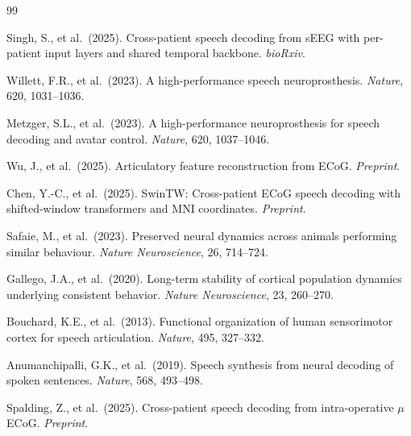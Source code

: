 \documentclass[11pt,letterpaper]{article}
\begin{document}
\begin{thebibliography}{99}\raggedright

Singh, S., et al.\ (2025).
Cross-patient speech decoding from sEEG with per-patient input layers and shared temporal backbone.
\textit{bioRxiv}.

Willett, F.R., et al.\ (2023).
A high-performance speech neuroprosthesis.
\textit{Nature}, 620, 1031--1036.

Metzger, S.L., et al.\ (2023).
A high-performance neuroprosthesis for speech decoding and avatar control.
\textit{Nature}, 620, 1037--1046.

Wu, J., et al.\ (2025).
Articulatory feature reconstruction from ECoG.
\textit{Preprint}.

Chen, Y.-C., et al.\ (2025).
SwinTW: Cross-patient ECoG speech decoding with shifted-window transformers and MNI coordinates.
\textit{Preprint}.

Safaie, M., et al.\ (2023).
Preserved neural dynamics across animals performing similar behaviour.
\textit{Nature Neuroscience}, 26, 714--724.

Gallego, J.A., et al.\ (2020).
Long-term stability of cortical population dynamics underlying consistent behavior.
\textit{Nature Neuroscience}, 23, 260--270.

Bouchard, K.E., et al.\ (2013).
Functional organization of human sensorimotor cortex for speech articulation.
\textit{Nature}, 495, 327--332.

Anumanchipalli, G.K., et al.\ (2019).
Speech synthesis from neural decoding of spoken sentences.
\textit{Nature}, 568, 493--498.

Spalding, Z., et al.\ (2025).
Cross-patient speech decoding from intra-operative $\mu$ECoG.
\textit{Preprint}.


\end{thebibliography}
\end{document}
